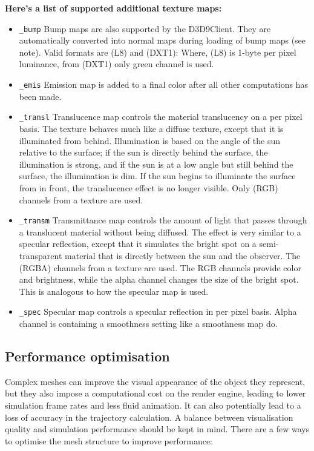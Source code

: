 \documentclass[Orbiter Developer Manual.tex]{subfiles}
\begin{document}
\textbf{Here's a list of supported additional texture maps:}
\begin{itemize}
\item	\texttt{\_bump} Bump maps are also supported by the D3D9Client. They are automatically converted into normal maps during loading of bump maps (see note). Valid formats are (L8) and (DXT1):  Where, (L8) is 1-byte per pixel luminance, from (DXT1) only green channel is used.
\item	\texttt{\_emis} Emission map is added to a final color after all other computations has been made. 
\item	\texttt{\_transl} Translucence map controls the material translucency on a per pixel basis. The texture behaves much like a diffuse texture, except that it is illuminated from behind. Illumination is based on the angle of the sun relative to the surface; if the sun is directly behind the surface, the illumination is strong, and if the sun is at a low angle but still behind the surface, the illumination is dim. If the sun begins to illuminate the surface from in front, the translucence effect is no longer visible. Only (RGB) channels from a texture are used. 
\item	\texttt{\_transm} Transmittance map controls the amount of light that passes through a translucent material without being diffused. The effect is very similar to a specular reflection, except that it simulates the bright spot on a semi-transparent material that is directly between the sun and the observer. The (RGBA) channels from a texture are used. The RGB channels provide color and brightness, while the alpha channel changes the size of the bright spot. This is analogous to how the specular map is used.
\item	\texttt{\_spec} Specular map controls a specular reflection in per pixel basis. Alpha channel is containing a smoothness setting like a smoothness map do.
\end{itemize}

\break
\subsection{Performance optimisation}
Complex meshes can improve the visual appearance of the object they represent, but they also impose a computational cost on the render engine, leading to lower simulation frame rates and less fluid animation. It can also potentially lead to a loss of accuracy in the trajectory calculation. A balance between visualisation quality and simulation performance should be kept in mind. There are a few ways to optimise the mesh structure to improve performance:
\end{document}
